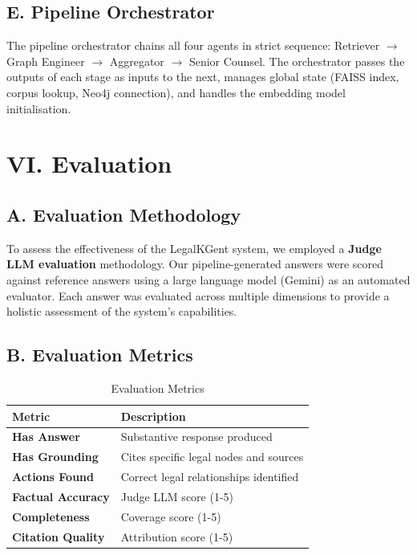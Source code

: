 \documentclass[10pt, a4paper, twocolumn]{article}
\begin{document}
\subsection{E. Pipeline Orchestrator}
The pipeline orchestrator chains all four agents in strict sequence: Retriever $\rightarrow$ Graph Engineer $\rightarrow$ Aggregator $\rightarrow$ Senior Counsel. The orchestrator passes the outputs of each stage as inputs to the next, manages global state (FAISS index, corpus lookup, Neo4j connection), and handles the embedding model initialisation.

\section{VI. Evaluation}

\subsection{A. Evaluation Methodology}
To assess the effectiveness of the LegalKGent system, we employed a \textbf{Judge LLM evaluation} methodology. Our pipeline-generated answers were scored against reference answers using a large language model (Gemini) as an automated evaluator. Each answer was evaluated across multiple dimensions to provide a holistic assessment of the system's capabilities.

\subsection{B. Evaluation Metrics}

\begin{table}[h]
\centering
\small
\begin{tabularx}{\columnwidth}{|>{\hsize=0.35\hsize}X|>{\hsize=0.65\hsize}X|}
\hline
\textbf{Metric} & \textbf{Description} \\
\hline
\textbf{Has Answer} & Substantive response produced \\
\hline
\textbf{Has Grounding} & Cites specific legal nodes and sources \\
\hline
\textbf{Actions Found} & Correct legal relationships identified \\
\hline
\textbf{Factual Accuracy} & Judge LLM score (1-5) \\
\hline
\textbf{Completeness} & Coverage score (1-5) \\
\hline
\textbf{Citation Quality} & Attribution score (1-5) \\
\hline
\end{tabularx}
\caption{Evaluation Metrics}
\end{table}
\end{document}
